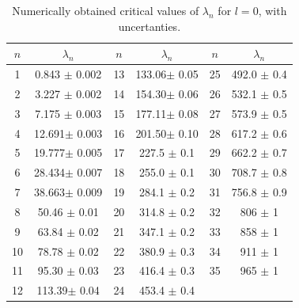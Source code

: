 \documentclass[12pt,twoside]{reedthesis}
\begin{document}
\begin{table}[h]
\centering
	\begin{tabular}{c|c||c|c||c|c}
		$n$ & $\lambda_n$ & $n$ & $\lambda_n$ & $n$ & $\lambda_n$ \\
		\hline
		1	& 0.843	$\pm$ 0.002	& 13	& 133.06$\pm$ 0.05	& 25	& 492.0	$\pm$ 0.4\\
		2	& 3.227	$\pm$ 0.002	& 14	& 154.30$\pm$ 0.06	& 26	& 532.1	$\pm$ 0.5\\
		3	& 7.175	$\pm$ 0.003	& 15	& 177.11$\pm$ 0.08	& 27	& 573.9	$\pm$ 0.5\\
		4	& 12.691$\pm$ 0.003	& 16	& 201.50$\pm$ 0.10	& 28	& 617.2	$\pm$ 0.6\\
		5	& 19.777$\pm$ 0.005	& 17	& 227.5	$\pm$ 0.1	& 29	& 662.2	$\pm$ 0.7\\
		6	& 28.434$\pm$ 0.007	& 18	& 255.0	$\pm$ 0.1	& 30	& 708.7	$\pm$ 0.8\\
		7	& 38.663$\pm$ 0.009	& 19	& 284.1	$\pm$ 0.2	& 31	& 756.8	$\pm$ 0.9\\
		8	& 50.46	$\pm$ 0.01	& 20	& 314.8	$\pm$ 0.2	& 32	& 806	$\pm$ 1\\
		9	& 63.84	$\pm$ 0.02	& 21	& 347.1	$\pm$ 0.2	& 33	& 858	$\pm$ 1\\
		10	& 78.78	$\pm$ 0.02	& 22	& 380.9	$\pm$ 0.3	& 34	& 911	$\pm$ 1\\
		11	& 95.30	$\pm$ 0.03	& 23	& 416.4	$\pm$ 0.3	& 35	& 965	$\pm$ 1\\
		12	& 113.39$\pm$ 0.04	& 24	& 453.4	$\pm$ 0.4	& 		& 
	\end{tabular}
	\caption{Numerically obtained critical values of $\lambda_n$ for $l = 0$, with uncertanties.}
	\label{tab:l0}
\end{table}
\end{document}
